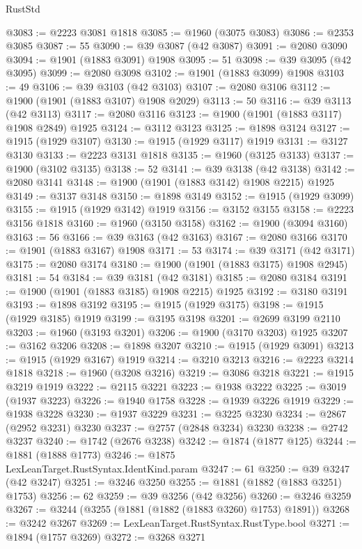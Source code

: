 \begin{lexlean}{RustStd}
\begin{coremodule}
{\begin{coremodule}
{{{{{{{{{{{{{{{{{{{{{{{{{{{{{{{{{{{{{{{{{{{@3083 := @2223 @3081 @1818
@3085 := @1960 (@3075 @3083)
@3086 := @2353 @3085
@3087 := 55
@3090 := @39 @3087 (@42 @3087)
@3091 := @2080 @3090
@3094 := @1901 (@1883 @3091) @1908
@3095 := 51
@3098 := @39 @3095 (@42 @3095)
@3099 := @2080 @3098
@3102 := @1901 (@1883 @3099) @1908
@3103 := 49
@3106 := @39 @3103 (@42 @3103)
@3107 := @2080 @3106
@3112 := @1900 (@1901 (@1883 @3107) @1908 @2029)
@3113 := 50
@3116 := @39 @3113 (@42 @3113)
@3117 := @2080 @3116
@3123 := @1900 (@1901 (@1883 @3117) @1908 @2849) @1925
@3124 := @3112 @3123
@3125 := @1898 @3124
@3127 := @1915 (@1929 @3107)
@3130 := @1915 (@1929 @3117) @1919
@3131 := @3127 @3130
@3133 := @2223 @3131 @1818
@3135 := @1960 (@3125 @3133)
@3137 := @1900 (@3102 @3135)
@3138 := 52
@3141 := @39 @3138 (@42 @3138)
@3142 := @2080 @3141
@3148 := @1900 (@1901 (@1883 @3142) @1908 @2215) @1925
@3149 := @3137 @3148
@3150 := @1898 @3149
@3152 := @1915 (@1929 @3099)
@3155 := @1915 (@1929 @3142) @1919
@3156 := @3152 @3155
@3158 := @2223 @3156 @1818
@3160 := @1960 (@3150 @3158)
@3162 := @1900 (@3094 @3160)
@3163 := 56
@3166 := @39 @3163 (@42 @3163)
@3167 := @2080 @3166
@3170 := @1901 (@1883 @3167) @1908
@3171 := 53
@3174 := @39 @3171 (@42 @3171)
@3175 := @2080 @3174
@3180 := @1900 (@1901 (@1883 @3175) @1908 @2945)
@3181 := 54
@3184 := @39 @3181 (@42 @3181)
@3185 := @2080 @3184
@3191 := @1900 (@1901 (@1883 @3185) @1908 @2215) @1925
@3192 := @3180 @3191
@3193 := @1898 @3192
@3195 := @1915 (@1929 @3175)
@3198 := @1915 (@1929 @3185) @1919
@3199 := @3195 @3198
@3201 := @2699 @3199 @2110
@3203 := @1960 (@3193 @3201)
@3206 := @1900 (@3170 @3203) @1925
@3207 := @3162 @3206
@3208 := @1898 @3207
@3210 := @1915 (@1929 @3091)
@3213 := @1915 (@1929 @3167) @1919
@3214 := @3210 @3213
@3216 := @2223 @3214 @1818
@3218 := @1960 (@3208 @3216)
@3219 := @3086 @3218
@3221 := @1915 @3219 @1919
@3222 := @2115 @3221
@3223 := @1938 @3222
@3225 := @3019 (@1937 @3223)
@3226 := @1940 @1758
@3228 := @1939 @3226 @1919
@3229 := @1938 @3228
@3230 := @1937 @3229
@3231 := @3225 @3230
@3234 := @2867 (@2952 @3231) @3230
@3237 := @2757 (@2848 @3234) @3230
@3238 := @2742 @3237
@3240 := @1742 (@2676 @3238)
@3242 := @1874 (@1877 @125)
@3244 := @1881 (@1888 @1773)
@3246 := @1875 LexLeanTarget.RustSyntax.IdentKind.param
@3247 := 61
@3250 := @39 @3247 (@42 @3247)
@3251 := @3246 @3250
@3255 := @1881 (@1882 (@1883 @3251) @1753)
@3256 := 62
@3259 := @39 @3256 (@42 @3256)
@3260 := @3246 @3259
@3267 := @3244 (@3255 (@1881 (@1882 (@1883 @3260) @1753) @1891))
@3268 := @3242 @3267
@3269 := LexLeanTarget.RustSyntax.RustType.bool
@3271 := @1894 (@1757 @3269)
@3272 := @3268 @3271
}}}}}}}}}}}}}}}}}}}}}}}}}}}}}}}}}}}}}}}}}}}
\end{coremodule}}
\end{coremodule}
\end{lexlean}

